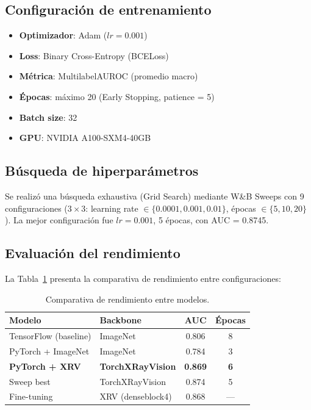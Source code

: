 \subsection{Configuraci\'on de entrenamiento}

\begin{itemize}
    \item \textbf{Optimizador}: Adam ($lr = 0.001$)
    \item \textbf{Loss}: Binary Cross-Entropy (BCELoss)
    \item \textbf{M\'etrica}: MultilabelAUROC (promedio macro)
    \item \textbf{\'Epocas}: m\'aximo 20 (Early Stopping, patience = 5)
    \item \textbf{Batch size}: 32
    \item \textbf{GPU}: NVIDIA A100-SXM4-40GB
\end{itemize}

\subsection{B\'usqueda de hiperpar\'ametros}

Se realiz\'o una b\'usqueda exhaustiva (Grid Search) mediante W\&B Sweeps \cite{wandb2020} con 9 configuraciones ($3 \times 3$: learning rate $\in \{0.0001, 0.001, 0.01\}$, \'epocas $\in \{5, 10, 20\}$). La mejor configuraci\'on fue $lr = 0.001$, 5 \'epocas, con AUC = 0.8745.

\subsection{Evaluaci\'on del rendimiento}

La Tabla~\ref{tab:results-models} presenta la comparativa de rendimiento entre configuraciones:

\begin{table}[H]
\centering
\caption{Comparativa de rendimiento entre modelos.}
\label{tab:results-models}
\small
\begin{tabular}{llcc}
\toprule
\textbf{Modelo} & \textbf{Backbone} & \textbf{AUC} & \textbf{\'Epocas} \\
\midrule
TensorFlow (baseline) & ImageNet & 0.806 & 8 \\
PyTorch + ImageNet & ImageNet & 0.784 & 3 \\
\textbf{PyTorch + XRV} & \textbf{TorchXRayVision} & \textbf{0.869} & \textbf{6} \\
Sweep best & TorchXRayVision & 0.874 & 5 \\
Fine-tuning & XRV (denseblock4) & 0.868 & --- \\
\bottomrule
\end{tabular}
\end{table}

